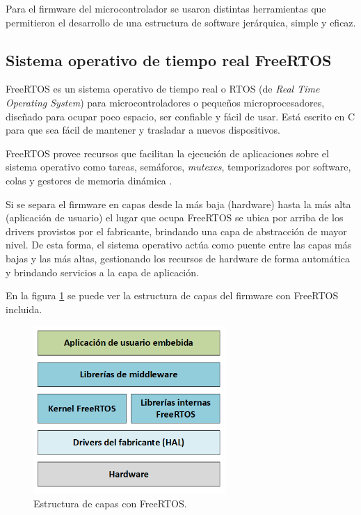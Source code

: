 Para el firmware del microcontrolador se usaron distintas herramientas que permitieron el desarrollo de una estructura de software jerárquica, simple y eficaz.

\subsection{Sistema operativo de tiempo real FreeRTOS}

FreeRTOS es un sistema operativo de tiempo real o RTOS (de \textit{Real Time Operating System}) para microcontroladores o pequeños microprocesadores, diseñado para ocupar poco espacio, ser confiable y fácil de usar. Está escrito en C para que sea fácil de mantener y trasladar a nuevos dispositivos.

FreeRTOS provee recursos que facilitan la ejecución de aplicaciones sobre el sistema operativo como tareas, semáforos, \textit{mutexes}, temporizadores por software, colas y gestores de memoria dinámica \citep{WEBSITE:1}.

Si se separa el firmware en capas desde la más baja (hardware) hasta la más alta (aplicación de usuario) el lugar que ocupa FreeRTOS se ubica por arriba de los drivers provistos por el fabricante, brindando una capa de abstracción de mayor nivel. De esta forma, el sistema operativo actúa como puente entre las capas más bajas y las más altas, gestionando los recursos de hardware de forma automática y brindando servicios a la capa de aplicación.

En la figura \ref{fig:capas} se puede ver la estructura de capas del firmware con FreeRTOS incluida.

\begin{figure}[H]
\centering
\includegraphics[width=0.65\textwidth]{./Figures/capas.png}
\caption{Estructura de capas con FreeRTOS.}
\label{fig:capas}
\end{figure}

